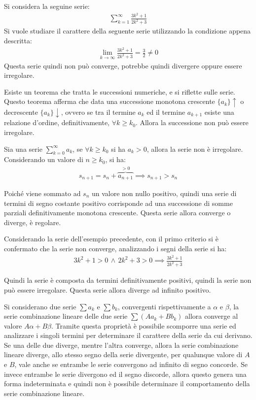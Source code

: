 \documentclass{article}
\numberwithin{equation}{subsection}
\begin{document}

Si considera la seguine serie:
\begin{gather*}
    \displaystyle\sum_{k=1}^\infty\frac{3k^2+1}{2k^2+3}
\end{gather*}
Si vuole studiare il carattere della seguente serie utilizzando la condizione appena descritta:
\begin{gather*}
    \lim_{k\to\infty}\displaystyle\frac{3k^2+1}{2k^2+3}=\frac{3}{2}\neq0
\end{gather*}
Questa serie quindi non può converge, potrebbe quindi divergere oppure essere irregolare. 


Esiste un teorema che tratta le successioni numeriche, e si riflette sulle serie. Questo teorema afferma che data una successione monotona crescente $\{a_k\}\uparrow$ o decrescente $\{a_k\}\downarrow$, ovvero se tra il termine $a_k$ ed il termine $a_{k+1}$ esiste una relazione d'ordine, definitivamente, $\forall k\geq k_0$. Allora la successione non può essere irregolare. 

Sia una serie $\sum_{k=0}^\infty a_k$, se $\forall k\geq k_0$ si ha $a_k>0$, allora la serie non è irregolare. Considerando un valore di $n\geq k_0$, si ha:
\begin{gather*}
    s_{n+1}=s_n+\overbrace{a_{n+1}}^{>0}\implies s_{n+1}>s_n
\end{gather*}

Poiché viene sommato ad $s_n$ un valore non nullo positivo, quindi una serie di termini di segno costante positivo corrisponde ad una successione di somme parziali definitivamente monotona crescente. Questa serie allora converge o diverge, è regolare. 

Considerando la serie dell'esempio precedente, con il primo criterio si è confermato che la serie non converge, analizzando i segni della serie si ha:
\begin{gather*}
    3k^2+1>0\,\land\,2k^2+3>0\implies\displaystyle\frac{3k^2+1}{2k^2+3}
\end{gather*}

Quindi la serie è composta da termini definitivamente positivi, quindi la serie non può essere irregolare. Questa serie allora diverge ad infinito positivo. 


Si considerano due serie $\sum a_k$ e $\sum b_k$, convergenti rispettivamente a $\alpha$ e $\beta$, la serie combinazione lineare delle due serie $\sum(Aa_k+Bb_k)$ allora converge al valore $A\alpha+B\beta$. Tramite questa proprietà è possibile scomporre una serie ed analizzare i singoli termini per determinare il carattere della serie da cui derivano. Se una delle due diverge, mentre l'altra converge, allora la serie combinazione lineare diverge, allo stesso segno della serie divergente, per qualunque valore di $A$ e $B$, vale anche se entrambe le serie convergono ad infinito di segno concorde. Se invece entrambe le serie divergono ed il segno discorde, allora questo genera una forma indeterminata e quindi non è possibile determinare il comportamento della serie combinazione lineare. 
\end{document}

